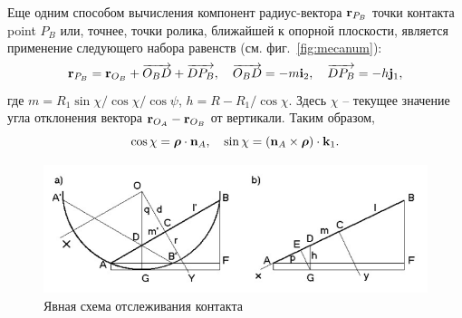 Еще одним способом вычисления компонент радиус-вектора ${\bf r}_{P_B}$ точки контакта point $P_B$ или, точнее, точки ролика, ближайшей к опорной плоскости, является применение следующего набора равенств (см. фиг.~\ref{fig:mecanum}):
$$
{\bf r}_{P_B}={\bf r}_{O_B}+\overrightarrow{O_BD}+\overrightarrow{DP_B},\quad
\overrightarrow{O_BD}=-m{\bf i}_2,\quad\overrightarrow{DP_B}=-h{\bf j}_1,
$$
где $m=R_1\sin\chi / \cos\chi/\cos\psi $, $h=R-R_1/\cos\chi$. Здесь $\chi$ -- текущее значение угла отклонения вектора ${\bf r}_{O_A}-{\bf r}_{O_B}$ от 
вертикали. Таким образом,
$$
\cos\chi=\boldsymbol{\mathbf{\rho}}\cdot{\bf n}_A, \quad \sin\chi=
\left({\bf n}_A\times\boldsymbol{\mathbf{\rho}}\right)\cdot {\bf k}_1.
$$
\begin{figure}[H]
\centerline{\includegraphics[scale=0.7]{content/parts/3_friction/mo2015/stepanov.png}}
\caption{Явная схема отслеживания контакта}
\label{fig:figure3}
\end{figure}
